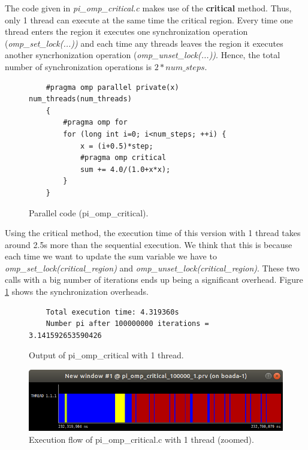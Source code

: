 \documentclass[12pt, a4paper]{article}
\begin{document}
The code given in \textit{pi\_omp\_critical.c} makes use of the \textbf{critical} method. Thus, only 1 thread can execute at the same time the critical region. Every time one thread enters the region it executes one synchronization operation (\textit{omp\_set\_lock(...))} and each time any threads leaves the region it executes another syncrhonization operation (\textit{omp\_unset\_lock(...))}. Hence, the total number of synchronization operations is $2 * num\_steps $.

\begin{figure}[H]
	\begin{lstlisting}
	#pragma omp parallel private(x) num_threads(num_threads)
    {
        #pragma omp for 
        for (long int i=0; i<num_steps; ++i) {
            x = (i+0.5)*step;
            #pragma omp critical 
	    	sum += 4.0/(1.0+x*x);
        }
    }
	\end{lstlisting}
	
	\caption{Parallel code (pi\_omp\_critical).}
\end{figure}

Using the critical method, the execution time of this version with 1 thread takes around 2.5s more than the sequential execution. We think that this is because each time we want to update the sum variable we have to \textit{omp\_set\_lock(critical\_region)} and \textit{ omp\_unset\_lock(critical\_region)}. These two calls with a big number of iterations ends up being a significant overhead. Figure \ref{pi_omp_critical_1_zoom} shows the synchronization overheads.

\begin{figure}[H]
	\begin{lstlisting}
	Total execution time: 4.319360s
	Number pi after 100000000 iterations = 3.141592653590426		
	\end{lstlisting}
	\caption{Output of pi\_omp\_critical with 1 thread.}
\end{figure}

\begin{figure}[H]
  \centering
  \includegraphics[scale=0.5]{./images/pi_omp_critical_1_zoom}
  \caption{Execution flow of pi\_omp\_critical.c with 1 thread (zoomed).}
  \label{pi_omp_critical_1_zoom}
\end{figure}
\end{document}

